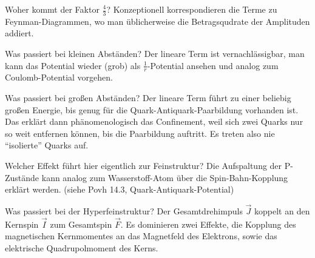 \begin{fquestion}{Woher kommt der Faktor $\frac{4}{3}$?}
    Konzeptionell korrespondieren die Terme zu Feynman-Diagrammen, wo man üblicherweise die Betragsqudrate der Amplituden addiert. 
\end{fquestion}

\begin{fquestion}{Was passiert bei kleinen Abständen?}
    Der lineare Term ist vernachlässigbar, man kann das Potential wieder (grob) als $\frac{1}{r}$-Potential ansehen und analog zum Coulomb-Potential vorgehen.
\end{fquestion}

\begin{fquestion}{Was passiert bei großen Abständen? }
    Der lineare Term führt zu einer beliebig großen Energie, bis genug für die Quark-Antiquark-Paarbildung vorhanden ist.
    Das erklärt dann phänomenologisch das Confinement, weil sich zwei Quarks nur so weit entfernen können, bis die Paarbildung auftritt.
    Es treten also nie ``isolierte'' Quarks auf.
\end{fquestion}

\begin{fquestion}{Welcher Effekt führt hier eigentlich zur Feinstruktur?}
    Die Aufspaltung der P-Zustände kann analog zum Wasserstoff-Atom über die Spin-Bahn-Kopplung erklärt werden.
    (siehe Povh 14.3, Quark-Antiquark-Potential)
\end{fquestion}

\begin{fquestion}{Was passiert bei der Hyperfeinstruktur?}
    Der Gesamtdrehimpuls $\Vec{J}$ koppelt an den Kernspin $\Vec{I}$ zum Gesamtspin $\Vec{F}$.
    Es dominieren zwei Effekte, die Kopplung des magnetischen Kernmomentes an das Magnetfeld des Elektrons, sowie das elektrische Quadrupolmoment des Kerns.
\end{fquestion}

